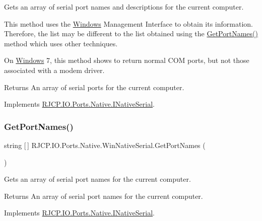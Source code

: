 Gets an array of serial port names and descriptions for the current computer. 

This method uses the \mbox{\hyperlink{namespace_r_j_c_p_1_1_i_o_1_1_ports_1_1_native_1_1_windows}{Windows}} Management Interface to obtain its information. Therefore, the list may be different to the list obtained using the \mbox{\hyperlink{class_r_j_c_p_1_1_i_o_1_1_ports_1_1_native_1_1_win_native_serial_a880da1abd27221e2c6369668f8408485}{Get\+Port\+Names()}} method which uses other techniques. 

On \mbox{\hyperlink{namespace_r_j_c_p_1_1_i_o_1_1_ports_1_1_native_1_1_windows}{Windows}} 7, this method shows to return normal C\+OM ports, but not those associated with a modem driver.

\begin{DoxyReturn}{Returns}
An array of serial ports for the current computer.
\end{DoxyReturn}


Implements \mbox{\hyperlink{interface_r_j_c_p_1_1_i_o_1_1_ports_1_1_native_1_1_i_native_serial_a7921194ade6a62e4b373cf8faec01c3f}{R\+J\+C\+P.\+I\+O.\+Ports.\+Native.\+I\+Native\+Serial}}.

\mbox{\label{class_r_j_c_p_1_1_i_o_1_1_ports_1_1_native_1_1_win_native_serial_a880da1abd27221e2c6369668f8408485}} 
\subsubsection{\texorpdfstring{GetPortNames()}{GetPortNames()}}
{\footnotesize\ttfamily string \mbox{[}$\,$\mbox{]} R\+J\+C\+P.\+I\+O.\+Ports.\+Native.\+Win\+Native\+Serial.\+Get\+Port\+Names (\begin{DoxyParamCaption}{ }\end{DoxyParamCaption})}



Gets an array of serial port names for the current computer. 

\begin{DoxyReturn}{Returns}
An array of serial port names for the current computer.
\end{DoxyReturn}


Implements \mbox{\hyperlink{interface_r_j_c_p_1_1_i_o_1_1_ports_1_1_native_1_1_i_native_serial_a5c29356160f31a94f992a9a023a78ff3}{R\+J\+C\+P.\+I\+O.\+Ports.\+Native.\+I\+Native\+Serial}}.

